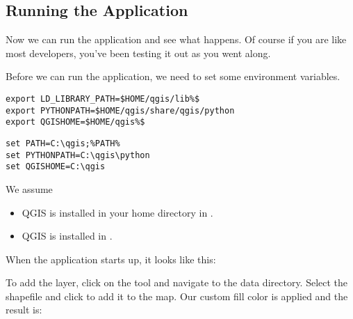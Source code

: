 \subsection{Running the Application}

Now we can run the application and see what happens. Of course if you are like 
most developers, you've been testing it out as you went along. 

Before we can run the application, we need to set some environment variables. 

\nix{}\osx{}
\begin{verbatim}
export LD_LIBRARY_PATH=$HOME/qgis/lib%$
export PYTHONPATH=$HOME/qgis/share/qgis/python
export QGISHOME=$HOME/qgis%$
\end{verbatim}

\win{}
\begin{verbatim}
set PATH=C:\qgis;%PATH%
set PYTHONPATH=C:\qgis\python
set QGISHOME=C:\qgis
\end{verbatim}

We assume
\begin{itemize}
\item\nix{}\osx{}QGIS is installed in 
your home directory in 
. 
\item\win{}QGIS is installed in .
\end{itemize}

When the application starts up, it looks like this:


To add the  layer, click on the 
 tool and navigate to the data directory.
Select the shapefile and click  to add it to the map. 
Our custom fill color is applied and the result is:


